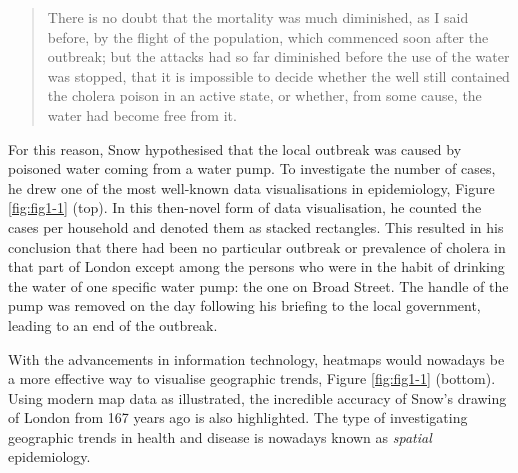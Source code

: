 \documentclass[
]{book}
\begin{document}
\begin{quote}
There is no doubt that the mortality was much diminished, as I said before, by the flight of the population, which commenced soon after the outbreak; but the attacks had so far diminished before the use of the water was stopped, that it is impossible to decide whether the well still contained the cholera poison in an active state, or whether, from some cause, the water had become free from it.
\end{quote}

For this reason, Snow hypothesised that the local outbreak was caused by poisoned water coming from a water pump. To investigate the number of cases, he drew one of the most well-known data visualisations in epidemiology, Figure \ref{fig:fig1-1} (top). In this then-novel form of data visualisation, he counted the cases per household and denoted them as stacked rectangles. This resulted in his conclusion that there had been no particular outbreak or prevalence of cholera in that part of London except among the persons who were in the habit of drinking the water of one specific water pump: the one on Broad Street. The handle of the pump was removed on the day following his briefing to the local government, leading to an end of the outbreak.

With the advancements in information technology, heatmaps would nowadays be a more effective way to visualise geographic trends, Figure \ref{fig:fig1-1} (bottom). Using modern map data as illustrated, the incredible accuracy of Snow's drawing of London from 167 years ago is also highlighted. The type of investigating geographic trends in health and disease is nowadays known as \emph{spatial} epidemiology.
\end{document}
